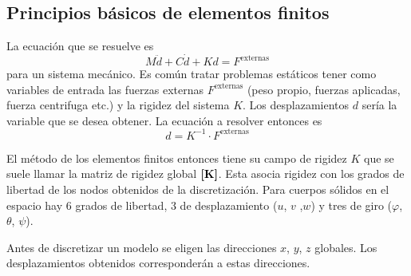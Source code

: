 \subsection*{Principios básicos de elementos finitos}

La ecuación que se resuelve es
\[
M\ddot{d} + C\dot{d} + Kd = F^{\mathrm{externas}}
\]
para un sistema mecánico. Es común tratar problemas estáticos tener como variables de entrada las fuerzas externas $F^{\mathrm{externas}}$ (peso propio, fuerzas aplicadas, fuerza centrifuga etc.) y la rigidez del sistema $K$. Los desplazamientos $d$ sería la variable que se desea obtener. La ecuación a resolver entonces es
\[
d =K^{-1} \cdot F^{\mathrm{externas}}
\]

El método de los elementos finitos entonces tiene su campo de rigidez $K$ que se suele llamar la matriz de rigidez global $\boldsymbol{[}\mathbf{K} \boldsymbol{]}$. Esta asocia rigidez con los grados de libertad de los nodos obtenidos de la discretización. Para cuerpos sólidos en el espacio hay 6 grados de libertad, 3 de desplazamiento ($u$, $v$ ,$w$) y tres de giro ($\varphi$, $\theta$, $\psi$). 

Antes de discretizar un modelo se eligen las direcciones $x$, $y$, $z$ globales. Los desplazamientos obtenidos corresponderán a estas direcciones.
